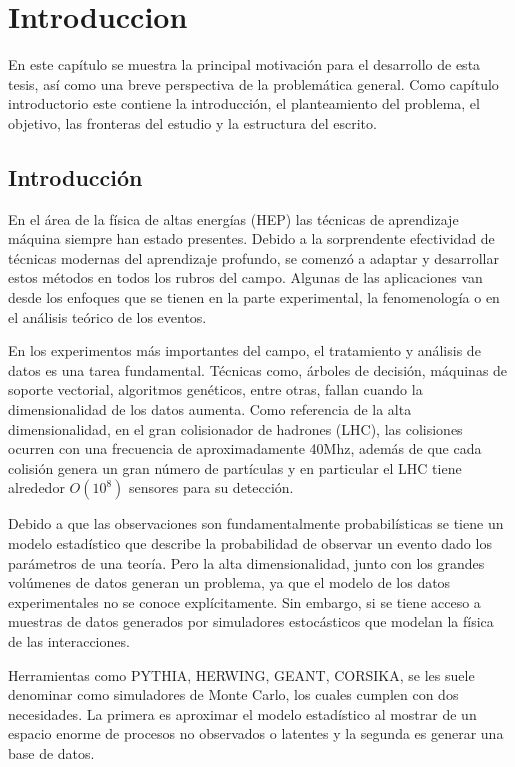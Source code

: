 \chapter{Introduccion}

\label{Chapter1}

En este capítulo se muestra la principal motivación para el desarrollo de esta tesis,
así como una breve perspectiva de la problemática general. Como capítulo introductorio este contiene la introducción, el planteamiento del problema, el objetivo, las fronteras del estudio y la estructura del escrito.

\section{Introducción}

En el área de la física de altas energías (HEP) las técnicas de aprendizaje máquina siempre han estado presentes. Debido a la sorprendente efectividad de técnicas modernas del aprendizaje profundo, se comenzó a adaptar y desarrollar estos métodos en todos los rubros del campo. Algunas de las aplicaciones van desde los enfoques que se tienen en la parte experimental, la fenomenología o en el análisis teórico de los eventos.

En los experimentos más importantes del campo, el tratamiento y análisis de datos es una tarea fundamental. Técnicas como, árboles de decisión, máquinas de soporte vectorial, algoritmos genéticos, entre otras, fallan cuando la dimensionalidad de los datos aumenta.
Como referencia de la alta dimensionalidad, en el gran colisionador de hadrones (LHC), las colisiones ocurren con una frecuencia de aproximadamente 40Mhz, además de que cada colisión genera un gran número de partículas y en particular el LHC tiene alrededor $O(10^8)$ sensores para su detección.

Debido a que las observaciones son fundamentalmente probabilísticas se tiene un modelo
estadístico que describe la probabilidad de observar un evento dado los parámetros de una teoría. Pero la alta dimensionalidad, junto con los grandes volúmenes de datos generan un problema, ya que el modelo de los datos experimentales no se conoce explícitamente. Sin embargo, si se tiene acceso a muestras de datos generados por simuladores estocásticos que modelan la física de las interacciones. 

Herramientas como PYTHIA, HERWING, GEANT, CORSIKA, se les suele denominar como simuladores de Monte Carlo, los cuales cumplen  con dos necesidades. La primera es aproximar el modelo estadístico al mostrar de un espacio enorme de procesos no observados o latentes y la segunda es generar una base de datos.


